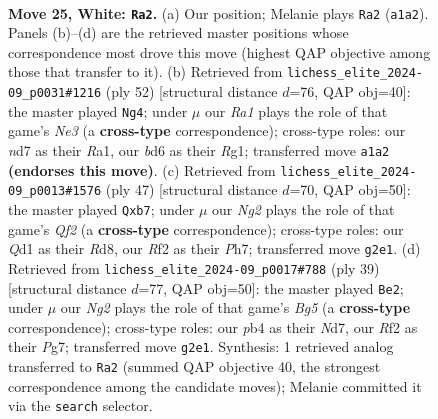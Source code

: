 \documentclass[11pt]{article}
\begin{document}
\clearpage

\begin{figure}[p]\centering
\begin{subfigure}{0.46\textwidth}\centering
\resizebox{\linewidth}{!}{%
\newchessgame
\chessboard[
  setfen={r6r/3nk2p/1ppbp1p1/8/1p1P3P/P3P2q/1P3RN1/R1BQ2K1 w - - 1 25},
  showmover=false,
  pgfstyle=straightmove, color=movearrow, markmove={a1-a2}
]}
\caption{}
\end{subfigure}\hfill
\begin{subfigure}{0.46\textwidth}\centering
\resizebox{\linewidth}{!}{%
\newchessgame
\chessboard[
  setfen={r4rk1/3qbp2/2p3p1/5PPb/1p2pB1Q/4N2P/PP5K/R5R1 w - - 0 27},
  showmover=false,
  pgfstyle=straightmove, color=movearrow, markmove={e3-g4}
]}
\caption{}
\end{subfigure}
\\[4pt]
\begin{subfigure}{0.46\textwidth}\centering
\resizebox{\linewidth}{!}{%
\newchessgame
\chessboard[
  setfen={3r2k1/1Q3q1p/p7/2Nnrbp1/4pp2/1P6/P4PPP/2R1RBK1 b - - 0 24},
  showmover=false,
  pgfstyle=straightmove, color=movearrow, markmove={f7-b7}
]}
\caption{}
\end{subfigure}\hfill
\begin{subfigure}{0.46\textwidth}\centering
\resizebox{\linewidth}{!}{%
\newchessgame
\chessboard[
  setfen={r3r1k1/1p1n2p1/1ppq3p/4p1N1/4P1bQ/2BP4/P1P3PP/R4R1K b - - 1 20},
  showmover=false,
  pgfstyle=straightmove, color=movearrow, markmove={g4-e2}
]}
\caption{}
\end{subfigure}
\caption{\textbf{Move 25, White: \texttt{Ra2}.} (a) Our position; Melanie plays \texttt{Ra2} (\texttt{a1a2}). Panels (b)--(d) are the retrieved master positions whose correspondence most drove this move (highest QAP objective among those that transfer to it). (b) Retrieved from \texttt{lichess\_elite\_2024-09\_p0031\#1216} (ply 52) [structural distance $d$=76, QAP obj=40]: the master played \texttt{Ng4}; under $\mu$ our \emph{Ra1} plays the role of that game's \emph{Ne3} (a \textbf{cross-type} correspondence); cross-type roles: our \emph{n}d7 as their \emph{R}a1, our \emph{b}d6 as their \emph{R}g1; transferred move \texttt{a1a2} \textbf{(endorses this move)}. (c) Retrieved from \texttt{lichess\_elite\_2024-09\_p0013\#1576} (ply 47) [structural distance $d$=70, QAP obj=50]: the master played \texttt{Qxb7}; under $\mu$ our \emph{Ng2} plays the role of that game's \emph{Qf2} (a \textbf{cross-type} correspondence); cross-type roles: our \emph{Q}d1 as their \emph{R}d8, our \emph{R}f2 as their \emph{P}h7; transferred move \texttt{g2e1}. (d) Retrieved from \texttt{lichess\_elite\_2024-09\_p0017\#788} (ply 39) [structural distance $d$=77, QAP obj=50]: the master played \texttt{Be2}; under $\mu$ our \emph{Ng2} plays the role of that game's \emph{Bg5} (a \textbf{cross-type} correspondence); cross-type roles: our \emph{p}b4 as their \emph{N}d7, our \emph{R}f2 as their \emph{P}g7; transferred move \texttt{g2e1}. Synthesis: 1 retrieved analog transferred to \texttt{Ra2} (summed QAP objective 40, the strongest correspondence among the candidate moves); Melanie committed it via the \texttt{search} selector.}
\label{fig:thought-m48}
\end{figure}
\end{document}
